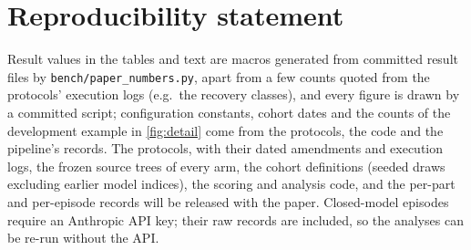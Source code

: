 \section*{Reproducibility statement}
Result values in the tables and text are macros generated from committed result files by \texttt{bench/paper\_numbers.py}, apart from a few counts quoted from the protocols' execution logs (e.g.\ the recovery classes), and every figure is drawn by a committed script; configuration constants, cohort dates and the counts of the development example in \cref{fig:detail} come from the protocols, the code and the pipeline's records. The protocols, with their dated amendments and execution logs, the frozen source trees of every arm, the cohort definitions (seeded draws excluding earlier model indices), the scoring and analysis code, and the per-part and per-episode records will be released with the paper. Closed-model episodes require an Anthropic API key; their raw records are included, so the analyses can be re-run without the API.
